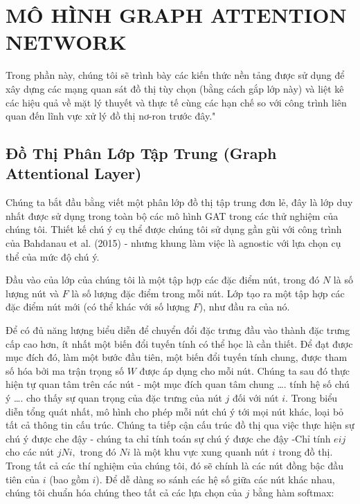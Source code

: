 \chapter{MÔ HÌNH GRAPH ATTENTION NETWORK}
\label{chap:MÔ HÌNH GRAPH ATTENTION NETWORK}


Trong phần này, chúng tôi sẽ trình bày các kiến thức nền tảng được sử dụng để xây dựng các mạng quan sát đồ thị tùy chọn (bằng cách gắp lớp này) và liệt kê các hiệu quả về mặt lý thuyết và thực tế cùng các hạn chế so với công trình liên quan đến lĩnh vực xử lý đồ thị nơ-ron trước đây."

\section{Đồ Thị Phân Lớp Tập Trung (Graph Attentional Layer)}
\label{sec:Đồ Thị Phân Lớp Tập Trung (Graph Attentional Layer)}

Chúng ta bắt đầu bằng viết một phân lớp đồ thị tập trung đơn lẻ, đây là lớp duy nhất được sử dụng trong toàn bộ các mô hình GAT trong các thử nghiệm của chúng tôi. Thiết kế chú ý cụ thể được chúng tôi sử dụng gần gũi với công trình của Bahdanau et al. (2015) - nhưng khung làm việc là agnostic với lựa chọn cụ thể của mức độ chú ý.

Đầu vào của lớp của chúng tôi là một tập hợp các đặc điểm nút, trong đó $N$ là số lượng nút và $F$ là số lượng đặc điểm trong mỗi nút. Lớp tạo ra một tập hợp các đặc điểm nút mới (có thể khác với số lượng $F$), như đầu ra của nó.

Để có đủ năng lượng biểu diễn để chuyển đổi đặc trưng đầu vào thành đặc trưng cấp cao hơn, ít nhất một biến đổi tuyến tính có thể học là cần thiết. Để đạt được mục đích đó, làm một bước đầu tiên, một biến đổi tuyến tính chung, được tham số hóa bởi ma trận trọng số $W$ được áp dụng cho mỗi nút. Chúng ta sau đó thực hiện tự quan tâm trên các nút - một mục đích quan tâm chung …. tính hệ số chú ý
….
cho thấy sự quan trọng của đặc trưng của nút $j$ đối với nút $i$. Trong biểu diễn tổng quát nhất, mô hình cho phép mỗi nút chú ý tới mọi nút khác, loại bỏ tất cả thông tin cấu trúc. Chúng ta tiếp cận cấu trúc đồ thị qua việc thực hiện sự chú ý được che đậy - chúng ta chỉ tính toán sự chú ý được che đậy -Chỉ tính $eij$ cho các nút $j Ni,$ trong đó $Ni$ là một khu vực xung quanh nút $i$ trong đồ thị. Trong tất cả các thí nghiệm của chúng tôi, đó sẽ chính là các nút đồng bậc đầu tiên của $i$ (bao gồm $i$). Để dễ dàng so sánh các hệ số giữa các nút khác nhau, chúng tôi chuẩn hóa chúng theo tất cả các lựa chọn của $j$ bằng hàm softmax:

